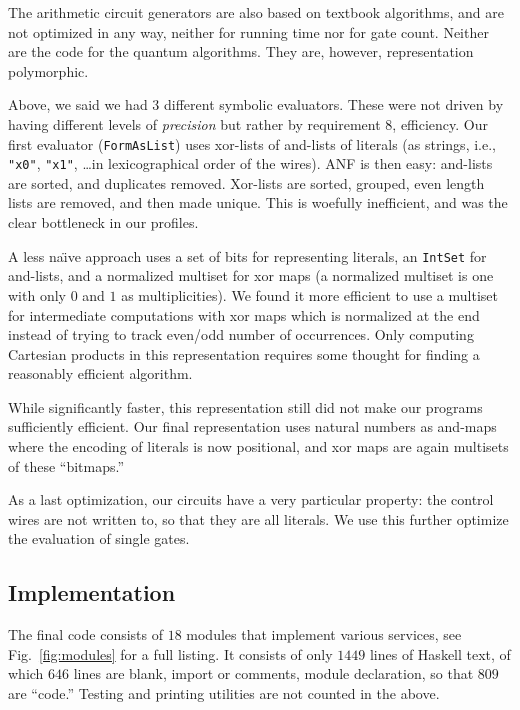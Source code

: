 \documentclass[sigplan,screen]{acmart}
\theoremstyle{definition}
\begin{document}
The arithmetic circuit generators are also based on textbook algorithms, and are
not optimized in any way, neither for running time nor for gate count. Neither are
the code for the quantum algorithms. They are, however, representation
polymorphic.

Above, we said we had $3$ different symbolic evaluators. These were not driven
by having different levels of \emph{precision} but rather by requirement $8$,
efficiency. Our first evaluator (\texttt{FormAsList}) uses xor-lists of
and-lists of literals (as strings, i.e.,
\texttt{"x0"}, \texttt{"x1"}, \ldots in lexicographical order of the wires). ANF
is then easy: and-lists are sorted, and duplicates removed. Xor-lists are sorted,
grouped, even length lists are removed, and then made unique. This is woefully
inefficient, and was the clear bottleneck in our profiles.

A less na\"{\i}ve approach uses a set of bits for representing literals, an
\texttt{IntSet} for and-lists, and a normalized multiset for xor maps (a normalized
multiset is one with only $0$ and $1$ as multiplicities). We found
it more efficient to use a multiset for intermediate computations with xor maps
which is normalized at the end instead of trying to track even/odd number of
occurrences. Only computing Cartesian products in this representation requires
some thought for finding a reasonably efficient algorithm.

While significantly faster, this representation still did not make our programs
sufficiently efficient. Our final representation uses natural numbers as
and-maps where the encoding of literals is now positional, and xor maps are
again multisets of these ``bitmaps.''

As a last optimization, our circuits have a very particular property: the control
wires are not written to, so that they are all literals. We use this
further optimize the evaluation of single gates.

\subsection{Implementation}

The final code consists of $18$ modules that implement various
services, see Fig.~\ref{fig:modules} for a full listing. It consists of
only $1449$ lines of Haskell text, of which $646$ lines are blank, import or
comments, module declaration, so that $809$ are ``code.'' Testing and printing
utilities are not counted in the above.
\end{document}
